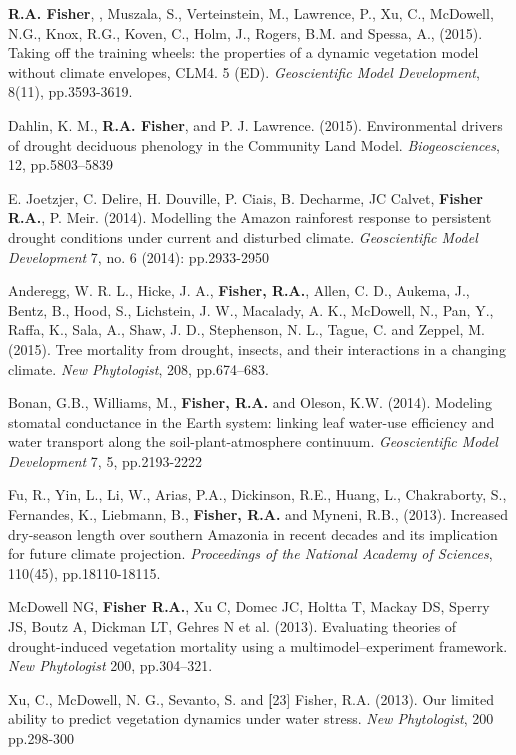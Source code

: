 \documentclass[10pt]{article}
\newenvironment{lonelist}[1][\enskip\textbullet]%
        {\vspace{-\baselineskip}\begin{list}{#1}{%
        \setlength{\itemindent}{-3pt} 
        \setlength{\partopsep}{0pt}%
        \setlength{\leftmargin}{10pt}
        \setlength{\topsep}{15pt}}}
        {\end{list}\vspace{-.3\baselineskip}}
\begin{document}
\begin{lonelist}
{\item[30] { \textbf{R.A. Fisher}, 
, Muszala, S., Verteinstein, M., Lawrence, P., Xu, C., McDowell, N.G., Knox, R.G., Koven, C., Holm, J., Rogers, B.M. and Spessa, A., (2015). Taking off the training wheels: the properties of a dynamic vegetation model without climate envelopes, CLM4. 5 (ED). \emph{Geoscientific Model Development}, 8(11), pp.3593-3619.} 

\item[29] {Dahlin, K. M., \textbf{R.A. Fisher}, and P. J. Lawrence. (2015). Environmental drivers of drought deciduous phenology in the Community Land Model. \emph{Biogeosciences}, 12, pp.5803–5839}

\item[28] {E. Joetzjer, C. Delire, H. Douville, P. Ciais,  B. Decharme, JC Calvet, \textbf{ Fisher R.A.}, P. Meir. (2014). Modelling the Amazon rainforest response to persistent drought conditions under current and disturbed climate. \emph{Geoscientific Model Development} 7, no. 6 (2014): pp.2933-2950}
\item [27] {Anderegg, W. R. L., Hicke, J. A., \textbf{Fisher, R.A.}, Allen, C. D., Aukema, J., Bentz, B., Hood, S., Lichstein, J. W., Macalady, A. K., McDowell, N., Pan, Y., Raffa, K., Sala, A., Shaw, J. D., Stephenson, N. L., Tague, C. and Zeppel, M. (2015). Tree mortality from drought, insects, and their interactions in a changing climate. \emph{New Phytologist}, 208, pp.674–683.}
\item[26] {  Bonan, G.B., Williams, M., \textbf{Fisher, R.A.} and Oleson, K.W. (2014). Modeling stomatal conductance in the Earth system: linking leaf water-use efficiency and water transport along the soil-plant-atmosphere continuum. \emph{Geoscientific Model Development} 7, 5,  pp.2193-2222}
\item[25] { Fu, R., Yin, L., Li, W., Arias, P.A., Dickinson, R.E., Huang, L., Chakraborty, S., Fernandes, K., Liebmann, B., \textbf{Fisher, R.A.} and Myneni, R.B., (2013). Increased dry-season length over southern Amazonia in recent decades and its implication for future climate projection. \emph{Proceedings of the National Academy of Sciences}, 110(45), pp.18110-18115.}
\item[24] {McDowell NG, \textbf{Fisher R.A.}, Xu C, Domec JC, Holtta T, Mackay DS, Sperry JS, Boutz A, Dickman LT, Gehres N et al. (2013). Evaluating theories of drought-induced vegetation mortality using a multimodel–experiment framework. \emph{New Phytologist} 200, pp.304–321.}

\item [23] {Xu, C., McDowell, N. G., Sevanto, S. and \textbf[23] {Fisher, R.A.} (2013). Our limited ability to predict vegetation dynamics under water stress. \emph{New Phytologist}, 200 pp.298-300}

}
\end{lonelist}
\end{document}
